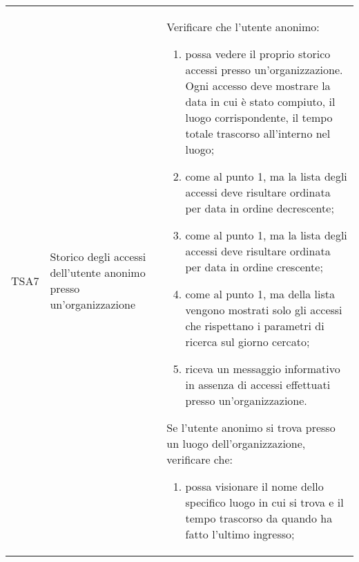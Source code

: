 {\begin{longtable}{ c | C{3cm} | C{11cm} }
TSA7 & Storico degli accessi dell'utente anonimo presso un'organizzazione & 
Verificare che l'utente anonimo:
\begin{enumerate}
    \item possa vedere il proprio storico accessi presso un'organizzazione. Ogni accesso deve mostrare la data in cui è stato compiuto, il luogo corrispondente, il tempo totale trascorso all'interno nel luogo;
    \item come al punto 1, ma la lista degli accessi deve risultare ordinata per data in ordine decrescente;
    \item come al punto 1, ma la lista degli accessi deve risultare ordinata per data in ordine crescente;
    \item come al punto 1, ma della lista vengono mostrati solo gli accessi che rispettano i parametri di ricerca sul giorno cercato;
    \item riceva un messaggio informativo in assenza di accessi effettuati presso un'organizzazione.
\end{enumerate}
Se l'utente anonimo si trova presso un luogo dell'organizzazione, verificare che:
\begin{enumerate}
    \item possa visionare il nome dello specifico luogo in cui si trova e il tempo trascorso da quando ha fatto l'ultimo ingresso;
\end{enumerate} \\


\end{longtable}}
